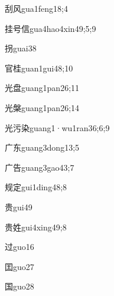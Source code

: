 \begin{verbete}{刮风}{gua1feng1}{8;4}
\end{verbete}
\begin{verbete}{挂号信}{gua4hao4xin4}{9;5;9}
\end{verbete}
\begin{verbete}{拐}{guai3}{8}
\end{verbete}
\begin{verbete}{官桂}{guan1gui4}{8;10}
\end{verbete}
\begin{verbete}{光盘}{guang1pan2}{6;11}
\end{verbete}
\begin{verbete}{光槃}{guang1pan2}{6;14}
\end{verbete}
\begin{verbete}{光污染}{guang1·wu1ran3}{6;6;9}
\end{verbete}
\begin{verbete}{广东}{guang3dong1}{3;5}
\end{verbete}
\begin{verbete}{广告}{guang3gao4}{3;7}
\end{verbete}
\begin{verbete}{规定}{gui1ding4}{8;8}
\end{verbete}
\begin{verbete}{贵}{gui4}{9}
\end{verbete}
\begin{verbete}{贵姓}{gui4xing4}{9;8}
\end{verbete}
\begin{verbete}{过}{guo1}{6}
\end{verbete}
\begin{verbete}{囯}{guo2}{7}
\end{verbete}
\begin{verbete}{国}{guo2}{8}
\end{verbete}
